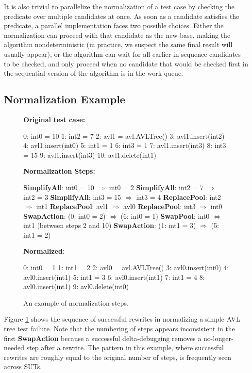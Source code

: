 It is also trivial to parallelize the normalization of a test case by
checking the predicate over multiple candidates at once.  As soon as a
candidate satisfies the predicate, a parallel implementation faces two
possible choices.
Either the normalization can proceed with that candidate as the new
base, making the algorithm nondeterministic (in practice, we suspect
the same final result will usually appear), or the algorithm can wait
for all earlier-in-sequence candidates to be checked, and only proceed
when no candidate that would be checked first in the sequential
version of the algorithm is in the work queue.

\subsection{Normalization Example}
\label{formalexample}

\begin{figure}
{\scriptsize
{\bf Original test case:}
\begin{code}
  0: int0 = 10 
  1: int2 = 7 
  2: avl1 = avl.AVLTree() 
  3: avl1.insert(int2) 
  4: avl1.insert(int0) 
  5: int1 = 1 
  6: int3 = 1 
  7: avl1.insert(int3) 
  8: int3 = 15 
  9: avl1.insert(int3) 
 10: avl1.delete(int1) 
\end{code}
{\bf Normalization Steps:}
\begin{code}
{\bf SimplifyAll}: int0 = 10 $\Rightarrow$ int0 = 2 
{\bf SimplifyAll}: int2 = 7  $\Rightarrow$ int2 = 3 
{\bf SimplifyAll}: int3 = 15  $\Rightarrow$ int3 = 4 
{\bf ReplacePool}: int2 $\Rightarrow$ int1
{\bf ReplacePool}: avl1 $\Rightarrow$ avl0
{\bf ReplacePool}: int3 $\Rightarrow$ int0
{\bf SwapAction}: (0: int0 = 2)  $\Leftrightarrow$ (6: int0 = 1)
{\bf SwapPool}: int0 $\Leftrightarrow$ int1 (between steps 2 and 10)
{\bf SwapAction}: (1: int1 = 3)  $\Rightarrow$ (5: int1 = 2)
\end{code}
{\bf Normalized:}
\begin{code}
  0: int0 = 1
  1: int1 = 2
  2: avl0 = avl.AVLTree()
  3: avl0.insert(int0) 
  4: avl0.insert(int1) 
  5: int1 = 3  
  6: avl0.insert(int1) 
  7: int1 = 4  
  8: avl0.insert(int1)  
  9: avl0.delete(int0) 
\end{code}
}
\caption{An example of normalization steps.}
\label{diffnorm}
\end{figure}

Figure \ref{diffnorm} shows the sequence of successful rewrites in
normalizing a simple AVL tree test failure.  Note that the numbering
of steps appears inconsistent in the first {\bf SwapAction} because a
successful delta-debugging removes a no-longer-needed step after a
rewrite.  The pattern in this example, where successful rewrites
are roughly equal to the original number of steps, is frequently seen across SUTs.


